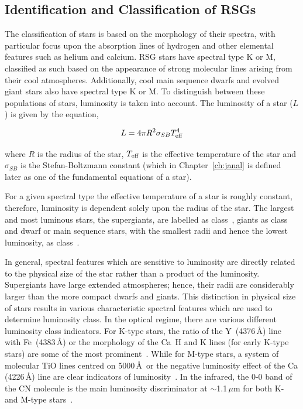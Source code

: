 \subsection{Identification and Classification of RSGs} %
\label{sub:selection_of_rsgs}

The classification of stars is based on the morphology of their spectra, with particular focus upon the absorption lines of hydrogen and other elemental features such as helium and calcium.
RSG stars have spectral type K or M, classified as such based on the appearance of strong molecular lines arising from their cool atmospheres.
Additionally, cool main sequence dwarfs and evolved giant stars also have spectral type K or M.
To distinguish between these populations of stars, luminosity is taken into account.
The luminosity of a star ($L$) is given by the equation,

\begin{equation}
    L = 4\pi R^2\sigma_{SB}T_{\rm eff}^4
\end{equation}

\noindent where $R$ is the radius of the star, $T_{\rm eff}$ is the effective temperature of the star and $\sigma_{SB}$ is the Stefan-Boltzmann constant (which in Chapter~\ref{ch:janal} is defined later as one of the fundamental equations of a star).

For a given spectral type the effective temperature of a star is roughly constant, therefore, luminosity is dependent solely upon the radius of the star.
The largest and most luminous stars, the supergiants, are labelled as class~\1, giants as class~\3 and dwarf or main sequence stars, with the smallest radii and hence the lowest luminosity, as class~\5.

In general, spectral features which are sensitive to luminosity are directly related to the physical size of the star rather than a product of the luminosity.
Supergiants have large extended atmospheres; hence, their radii are considerably larger than the more compact dwarfs and giants.
This distinction in physical size of stars results in various characteristic spectral features which are used to determine luminosity class.
In the optical regime, there are various different luminosity class indicators.
For K-type stars, the ratio of the Y\,\2 (4376\,\AA) line with Fe\,\1 (4383\,\AA) or the morphology of the Ca\,\2 H and K lines (for early K-type stars) are some of the most prominent~\citep{b:GrayCorbally}.
While for M-type stars, a system of molecular TiO lines centred on 5000\,\AA ~or the negative luminosity effect of the Ca\,\1 (4226\,\AA) line are clear indicators of luminosity~\citep{b:GrayCorbally}.
In the infrared, the 0-0 band of the CN molecule is the main luminosity discriminator at $\sim$1.1\,$\mu$m for both K- and M-type stars~\citep{b:GrayCorbally}.


